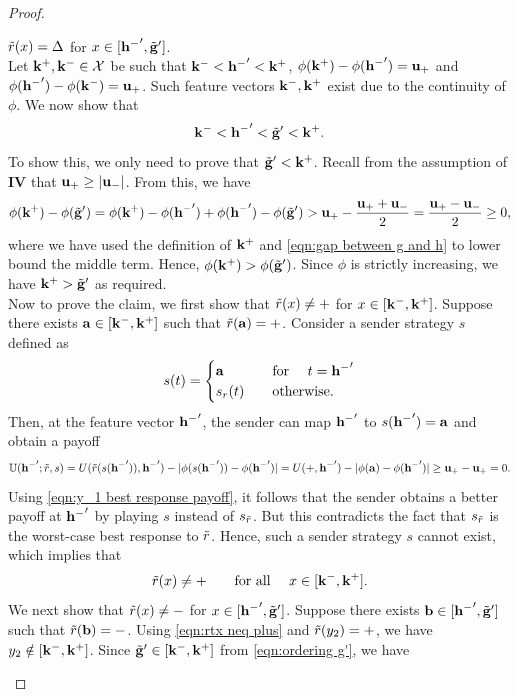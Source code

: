 \begin{proof}
\begin{claims}{$\tilde{r}(x) = \Delta$ for $x \in [\mathbf{h^{-}}', \tilde{\mathbf{g}}']$.}\\
	Let $\mathbf{k}^+, \mathbf{k}^- \in \mathcal{X}$ be such that $\mathbf{k}^- < \mathbf{h^{-}}' < \mathbf{k}^+$, $\phi(\mathbf{k}^+) - \phi(\mathbf{h^{-}}') = \mathbf{u_+}$ and $\phi(\mathbf{h^{-}}') - \phi(\mathbf{k}^-) = \mathbf{u_+}$. Such feature vectors $\mathbf{k}^-, \mathbf{k}^+$ exist due to the continuity of $\phi$. We now show that
	\begin{equation}\label{eqn:ordering g'}
		\mathbf{k}^- < \mathbf{h^{-}}' < \tilde{\mathbf{g}}' < \mathbf{k}^+.
	\end{equation}
	To show this, we only need to prove that $\tilde{\mathbf{g}}' < \mathbf{k}^+$. Recall from the assumption of \textbf{IV} that $\mathbf{u_+} \geq |\mathbf{u_-}|$. From this, we have
	\begin{equation}\label{eqn:gap}
		\phi(\mathbf{k}^+) - \phi(\tilde{\mathbf{g}}') = \phi(\mathbf{k}^+) - \phi(\mathbf{h^{-}}') + \phi(\mathbf{h^{-}}') - \phi(\tilde{\mathbf{g}}') > \mathbf{u_+} - \frac{\mathbf{u_+} + \mathbf{u_-}}{2} = \frac{\mathbf{u_+} - \mathbf{u_-}}{2} \geq 0,
	\end{equation}
	where we have used the definition of $\mathbf{k}^+$ and \eqref{eqn:gap between g and h} to lower bound the middle term. Hence, $\phi(\mathbf{k}^+) > \phi(\tilde{\mathbf{g}}')$. Since $\phi$ is strictly increasing, we have $\mathbf{k}^+ > \tilde{\mathbf{g}}'$ as required. \\
	Now to prove the claim, we first show that $\tilde{r}(x) \neq \mathbf{+}$ for $x \in [\mathbf{k}^-, \mathbf{k}^+]$. Suppose there exists $\mathbf{a} \in [\mathbf{k}^-, \mathbf{k}^+]$ such that $\tilde{r}(\mathbf{a}) = \mathbf{+}$.
	Consider a sender strategy $s$ defined as
	\[
	s(t) = \begin{cases}
		\mathbf{a} & \hbox{\quad for \quad} t = \mathbf{h^{-}}' \\
		s_r(t) & \hbox{\quad otherwise.\quad}
	\end{cases}
	\]
	Then, at the feature vector $\mathbf{h^{-}}'$, the sender can map $\mathbf{h^{-}}'$ to $s(\mathbf{h^{-}}') = \mathbf{a}$ and obtain a payoff
	\[
	\mathbb{U}(\mathbf{h^{-}}'; \tilde{r}, s) = U(\tilde{r}(s(\mathbf{h^{-}}')), \mathbf{h^{-}}') - |\phi(s(\mathbf{h^{-}}')) - \phi(\mathbf{h^{-}}')| =
	U(\mathbf{+}, \mathbf{h^{-}}') - |\phi(\mathbf{a}) - \phi(\mathbf{h^{-}}')| \geq \mathbf{u_+} - \mathbf{u_+} = 0.
	\]
	Using \eqref{eqn:y_1 best response payoff}, it follows that the sender obtains a better payoff at $\mathbf{h^{-}}'$ by playing $s$ instead of $s_{\tilde{r}}$. But this contradicts the fact that $s_{\tilde{r}}$ is the worst-case best response to $\tilde{r}$. Hence, such a sender strategy $s$ cannot exist, which implies that
	\begin{equation}\label{eqn:rtx neq plus}
		\tilde{r}(x) \neq \mathbf{+} \quad \hbox{\quad for all \quad} x \in [\mathbf{k}^-, \mathbf{k}^+].
	\end{equation}
	We next show that $\tilde{r}(x) \neq \mathbf{-}$ for $x \in [\mathbf{h^{-}}', \tilde{\mathbf{g}}']$. Suppose there exists $\mathbf{b} \in [\mathbf{h^{-}}', \tilde{\mathbf{g}}']$ such that $\tilde{r}(\mathbf{b}) = \mathbf{-}$.
	Using \eqref{eqn:rtx neq plus} and $\tilde{r}(y_2) = \mathbf{+}$, we have $y_2 \notin [\mathbf{k}^-, \mathbf{k}^+]$. Since $\tilde{\mathbf{g}}' \in [\mathbf{k}^-, \mathbf{k}^+]$ from \eqref{eqn:ordering g'}, we have

\end{claims}
\end{proof}
